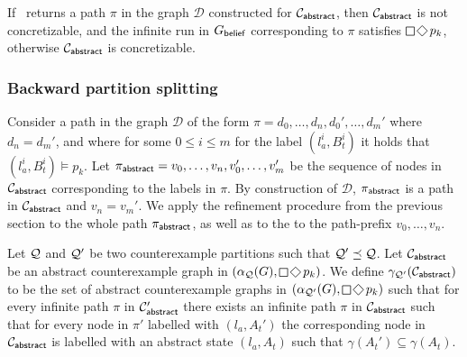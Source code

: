 \begin{theorem}
If \cexliveness\ returns a path $\pi$ in the graph $\mathcal D$ constructed for $\mathcal{C}_{\mathsf{abstract}}$, then $\mathcal{C}_{\mathsf{abstract}}$ is not concretizable, and the infinite run in $G_{\mathsf{belief}}$ corresponding to $\pi$ satisfies $\LTLglobally\LTLfinally p_k$, otherwise  $\mathcal{C}_{\mathsf{abstract}}$ is concretizable.
\end{theorem}

\subsubsection{Backward partition splitting}

Consider a path in the graph $\mathcal{D}$ of the form $\pi = d_0,\ldots, d_n,d_0',\ldots,d_m'$ where $d_n = d_m'$, and where for some $0 \leq i \leq m$ for the label $(l_a^i,B_t^i)$ it holds that $(l_a^i,B_t^i) \models p_k$. Let 
$\pi_{\mathsf{abstract}} = v_0,\ldots, v_n,v_0',\ldots,v_m'$ be the sequence of nodes in $\mathcal{C}_{\mathsf{abstract}}$ corresponding to the labels in $\pi$. By construction of $\mathcal D$, $\pi_{\mathsf{abstract}}$ is a path in $\mathcal{C}_{\mathsf{abstract}}$ and $v_n = v_m'$. We apply the refinement procedure from the previous section to the whole path $\pi_{\mathsf{abstract}}$, as well as to the to the path-prefix $v_0,\ldots, v_n$.

Let $\mathcal{Q}$ and $\mathcal{Q}'$ be two counterexample partitions such that $\mathcal{Q}' \preceq \mathcal{Q}$. Let $\mathcal{C}_{\mathsf{abstract}}$ be an abstract counterexample graph in $(\alpha_\part(G),\LTLglobally\LTLfinally p_k)$. We define $\gamma_{\mathcal{Q}'}(\mathcal{C}_{\mathsf{abstract}})$ to be the set of abstract counterexample graphs in $(\alpha_{\part'}(G),\LTLglobally\LTLfinally p_k)$ such that for every infinite path $\pi$ in $\mathcal{C}_{\mathsf{abstract}}'$ there exists an infinite path $\pi$ in $\mathcal{C}_{\mathsf{abstract}}$ such that for every node in $\pi'$ labelled with $(l_a,A_t')$ the corresponding node in $\mathcal{C}_{\mathsf{abstract}}$ is labelled with an abstract state $(l_a,A_t)$ such that $\gamma(A_t') \subseteq \gamma(A_t)$.

